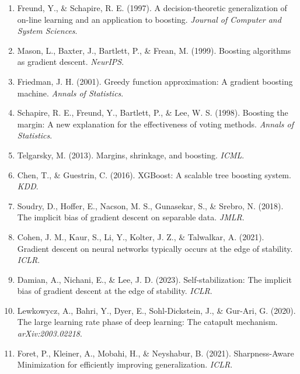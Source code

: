 \documentclass[12pt, a4paper]{ctexart}
\begin{document}
\begin{enumerate}
    \item Freund, Y., \& Schapire, R. E. (1997). A decision-theoretic generalization of on-line learning and an application to boosting. \textit{Journal of Computer and System Sciences}.

    \item Mason, L., Baxter, J., Bartlett, P., \& Frean, M. (1999). Boosting algorithms as gradient descent. \textit{NeurIPS}.

    \item Friedman, J. H. (2001). Greedy function approximation: A gradient boosting machine. \textit{Annals of Statistics}.

    \item Schapire, R. E., Freund, Y., Bartlett, P., \& Lee, W. S. (1998). Boosting the margin: A new explanation for the effectiveness of voting methods. \textit{Annals of Statistics}.

    \item Telgarsky, M. (2013). Margins, shrinkage, and boosting. \textit{ICML}.

    \item Chen, T., \& Guestrin, C. (2016). XGBoost: A scalable tree boosting system. \textit{KDD}.

    \item Soudry, D., Hoffer, E., Nacson, M. S., Gunasekar, S., \& Srebro, N. (2018). The implicit bias of gradient descent on separable data. \textit{JMLR}.

    \item Cohen, J. M., Kaur, S., Li, Y., Kolter, J. Z., \& Talwalkar, A. (2021). Gradient descent on neural networks typically occurs at the edge of stability. \textit{ICLR}.

    \item Damian, A., Nichani, E., \& Lee, J. D. (2023). Self-stabilization: The implicit bias of gradient descent at the edge of stability. \textit{ICLR}.

    \item Lewkowycz, A., Bahri, Y., Dyer, E., Sohl-Dickstein, J., \& Gur-Ari, G. (2020). The large learning rate phase of deep learning: The catapult mechanism. \textit{arXiv:2003.02218}.

    \item Foret, P., Kleiner, A., Mobahi, H., \& Neyshabur, B. (2021). Sharpness-Aware Minimization for efficiently improving generalization. \textit{ICLR}.
\end{enumerate}
\end{document}
